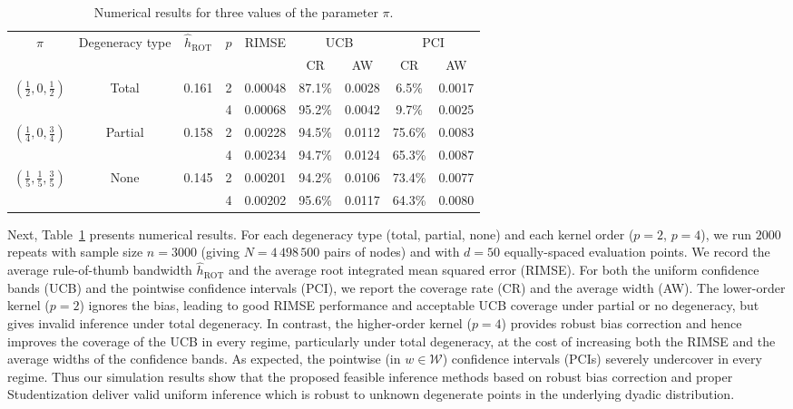 \documentclass[11pt,lof]{puthesis}
\newcommand{\cW}{\ensuremath{\mathcal{W}}}
\DeclareMathOperator{\ROT}{ROT}
\theoremstyle{break}
\theoremstyle{proof}
\begin{document}
\begin{table}[b!]
  \centering
  \begin{tabular}{|c|c|c|c|c|cc|cc|}
    \hline
    \multirow{2}{*}{$ \pi $}
    & \multirow{2}{*}{Degeneracy type}
    & \multirow{2}{*}{$ \hat h_{\ROT} $}
    & \multirow{2}{*}{$ p $}
    & \multirow{2}{*}{RIMSE}
    & \multicolumn{2}{|c|}{UCB}
    & \multicolumn{2}{|c|}{PCI} \\
    \cline{6-9}
    & & & &
    & CR & AW
    & CR & AW \\
    \hline
    \multirow{2}{*}{$ \left(\frac{1}{2}, 0, \frac{1}{2}\right) $}
    & \multirow{2}{*}{Total}
    & \multirow{2}{*}{0.161}
    & 2 & 0.00048 & 87.1\% & 0.0028 & 6.5\% & 0.0017 \\
    & & & 4 & 0.00068 & 95.2\% & 0.0042 & 9.7\% & 0.0025 \\
    \hline
    \multirow{2}{*}{$ \left(\frac{1}{4}, 0, \frac{3}{4}\right) $}
    & \multirow{2}{*}{Partial}
    & \multirow{2}{*}{0.158}
    & 2 & 0.00228 & 94.5\% & 0.0112 & 75.6\% & 0.0083 \\
    & & & 4 & 0.00234 & 94.7\% & 0.0124 & 65.3\% & 0.0087 \\
    \hline
    \multirow{2}{*}{$ \left(\frac{1}{5}, \frac{1}{5}, \frac{3}{5}\right) $}
    & \multirow{2}{*}{None}
    & \multirow{2}{*}{0.145}
    & 2 & 0.00201 & 94.2\% & 0.0106 & 73.4\% & 0.0077 \\
    & & & 4 & 0.00202 & 95.6\% & 0.0117 & 64.3\% & 0.0080 \\
    \hline
  \end{tabular}
  \caption[Numerical results for three values of the parameter $\pi$]{
  Numerical results for three values of the parameter $\pi$.}
  \label{tab:kernel_results}
\end{table}

Next, Table~\ref{tab:kernel_results} presents numerical results. For each
degeneracy
type (total, partial, none) and each kernel order ($p=2$, $p=4$), we run $2000$
repeats with sample size $n=3000$ (giving $N=4\,498\,500$ pairs of nodes) and
with $d=50$ equally-spaced evaluation points. We record the average
rule-of-thumb bandwidth $\hat{h}_{\ROT}$ and the average root integrated mean
squared error (RIMSE). For both the uniform confidence bands (UCB) and the
pointwise confidence intervals (PCI), we report the coverage rate (CR) and the
average width (AW).
%
The lower-order kernel ($p=2$) ignores the bias, leading to good RIMSE
performance and acceptable UCB coverage under partial or no degeneracy, but
gives invalid inference under total degeneracy. In contrast, the higher-order
kernel ($p=4$) provides robust bias correction and hence improves the coverage
of the UCB in every regime, particularly under total degeneracy, at the cost of
increasing both the RIMSE and the average widths of the confidence bands.
%
As expected, the pointwise (in $w\in\cW$) confidence intervals (PCIs) severely
undercover in every regime. Thus our simulation results show that the proposed
feasible inference methods based on robust bias correction and proper
Studentization deliver valid uniform inference which is robust to unknown
degenerate points in the underlying dyadic distribution.
\end{document}
